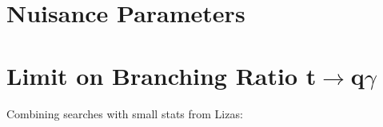 \section{Nuisance Parameters}

\section{Limit on Branching Ratio t$\rightarrow$q$\gamma$}
\label{sec:Limits}
Combining searches with small stats from Lizas: \cite{Junk:1999kv}

%

